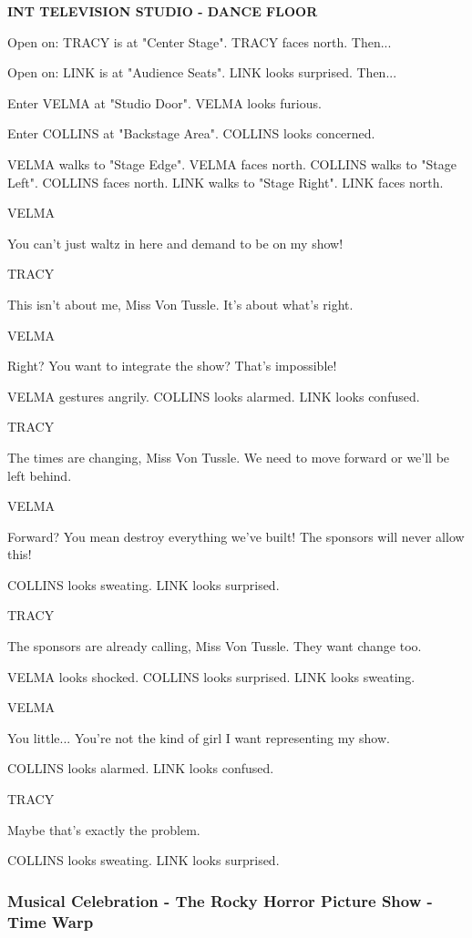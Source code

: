 \documentclass[11pt,letterpaper,oldstylefigures]{memoir}
\newcommand{\slugline}[1]{\nobreak\textbf{\MakeUppercase{#1}}\par\nobreak\vspace{1\baselineskip}}
\newcommand{\speaker}[1]{\nobreak\hspace*{0.333\textwidth}\MakeUppercase{#1}\par\nobreak\vspace{0.5\baselineskip}}
\newcommand{\dialogue}[1]{\nobreak\hspace*{0.25\textwidth}\begin{minipage}{0.5\textwidth}#1\end{minipage}\par\vspace{1\baselineskip}}
\newcommand{\stagedir}[1]{#1\par\vspace{1\baselineskip}}
\newenvironment{FountainExample}
  {\begingroup
  \ttfamily\small
   \setlength{\parindent}{0pt}
  \setlength{\parskip}{0.5em}
  \allowdisplaybreaks
  \setlength{\displaywidowpenalty}{0}
  \setlength{\widowpenalty}{0}
  \setlength{\clubpenalty}{0}
  \setlength{\interlinepenalty}{0}
}
  {\endgroup}
\begin{document}
\begin{FountainExample}
\slugline{INT TELEVISION STUDIO - DANCE FLOOR}

\stagedir{Open on: TRACY is at "Center Stage". TRACY faces north. Then...}
\stagedir{Open on: LINK is at "Audience Seats". LINK looks surprised. Then...}
\stagedir{Enter VELMA at "Studio Door". VELMA looks furious.}
\stagedir{Enter COLLINS at "Backstage Area". COLLINS looks concerned.}
\stagedir{VELMA walks to "Stage Edge". VELMA faces north. COLLINS walks to "Stage Left". COLLINS faces north. LINK walks to "Stage Right". LINK faces north.}

\speaker{VELMA}
\dialogue{You can't just waltz in here and demand to be on my show!}

\speaker{TRACY}
\dialogue{This isn't about me, Miss Von Tussle. It's about what's right.}

\speaker{VELMA}
\dialogue{Right? You want to integrate the show? That's impossible!}

\stagedir{VELMA gestures angrily. COLLINS looks alarmed. LINK looks confused.}

\speaker{TRACY}
\dialogue{The times are changing, Miss Von Tussle. We need to move forward or we'll be left behind.}

\speaker{VELMA}
\dialogue{Forward? You mean destroy everything we've built! The sponsors will never allow this!}

\stagedir{COLLINS looks sweating. LINK looks surprised.}

\speaker{TRACY}
\dialogue{The sponsors are already calling, Miss Von Tussle. They want change too.}

\stagedir{VELMA looks shocked. COLLINS looks surprised. LINK looks sweating.}

\speaker{VELMA}
\dialogue{You little... You're not the kind of girl I want representing my show.}

\stagedir{COLLINS looks alarmed. LINK looks confused.}

\speaker{TRACY}
\dialogue{Maybe that's exactly the problem.}

\stagedir{COLLINS looks sweating. LINK looks surprised.}
\end{FountainExample}

\subsubsection*{Musical Celebration - The Rocky Horror Picture Show - Time Warp}
\label{ex:musical-celebration-rocky-horror}
\end{document}

